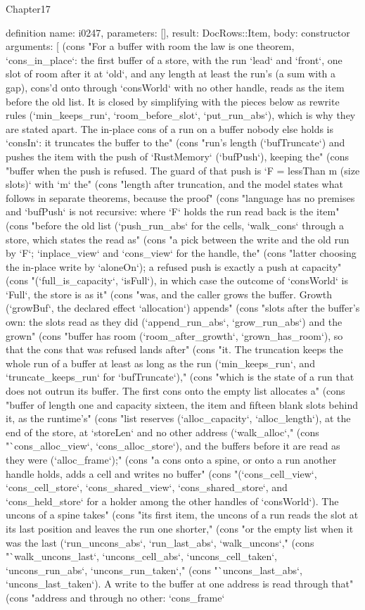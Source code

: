 \begin{lexlean}{Chapter17}
\begin{semanticmodule}
definition{
  name: i0247,
  parameters: [],
  result: DocRows::Item,
  body: constructor{
    arguments: [
      (cons "For a buffer with room the law is one theorem, `cons_in_place`: the first buffer of a store, with the run `lead` and `front`, one slot of room after it at `old`, and any length at least the run's (a sum with a gap), cons'd onto through `consWorld` with no other handle, reads as the item before the old list. It is closed by simplifying with the pieces below as rewrite rules (`min_keeps_run`, `room_before_slot`, `put_run_abs`), which is why they are stated apart. The in-place cons of a run on a buffer nobody else holds is `consIn`: it truncates the buffer to the" (cons "run's length (`bufTruncate`) and pushes the item with the push of `RustMemory` (`bufPush`), keeping the" (cons "buffer when the push is refused. The guard of that push is `F = lessThan m (size slots)` with `m` the" (cons "length after truncation, and the model states what follows in separate theorems, because the proof" (cons "language has no premises and `bufPush` is not recursive: where `F` holds the run read back is the item" (cons "before the old list (`push_run_abs` for the cells, `walk_cons` through a store, which states the read as" (cons "a pick between the write and the old run by `F`; `inplace_view` and `cons_view` for the handle, the" (cons "latter choosing the in-place write by `aloneOn`); a refused push is exactly a push at capacity" (cons "(`full_is_capacity`, `isFull`), in which case the outcome of `consWorld` is `Full`, the store is as it" (cons "was, and the caller grows the buffer. Growth (`growBuf`, the declared effect `allocation`) appends" (cons "slots after the buffer's own: the slots read as they did (`append_run_abs`, `grow_run_abs`) and the grown" (cons "buffer has room (`room_after_growth`, `grown_has_room`), so that the cons that was refused lands after" (cons "it. The truncation keeps the whole run of a buffer at least as long as the run (`min_keeps_run`, and `truncate_keeps_run` for `bufTruncate`)," (cons "which is the state of a run that does not outrun its buffer. The first cons onto the empty list allocates a" (cons "buffer of length one and capacity sixteen, the item and fifteen blank slots behind it, as the runtime's" (cons "list reserves (`alloc_capacity`, `alloc_length`), at the end of the store, at `storeLen` and no other address (`walk_alloc`," (cons "`cons_alloc_view`, `cons_alloc_store`), and the buffers before it are read as they were (`alloc_frame`);" (cons "a cons onto a spine, or onto a run another handle holds, adds a cell and writes no buffer" (cons "(`cons_cell_view`, `cons_cell_store`, `cons_shared_view`, `cons_shared_store`, and `cons_held_store` for a holder among the other handles of `consWorld`). The uncons of a spine takes" (cons "its first item, the uncons of a run reads the slot at its last position and leaves the run one shorter," (cons "or the empty list when it was the last (`run_uncons_abs`, `run_last_abs`, `walk_uncons`," (cons "`walk_uncons_last`, `uncons_cell_abs`, `uncons_cell_taken`, `uncons_run_abs`, `uncons_run_taken`," (cons "`uncons_last_abs`, `uncons_last_taken`). A write to the buffer at one address is read through that" (cons "address and through no other: `cons_frame` }}
\end{semanticmodule}
\end{lexlean}
